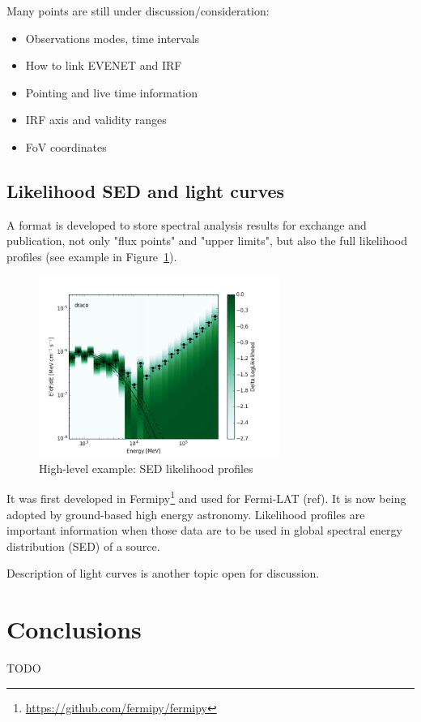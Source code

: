 Many points are still under discussion/consideration:

\begin{itemize}
\item{}Observations modes, time intervals
\item{}How to link EVENET and IRF
\item{}Pointing and live time information
\item{}IRF axis and validity ranges
\item{}FoV coordinates
\end{itemize}

\subsection{Likelihood SED and light curves}

A format is developed to store spectral analysis results for exchange and publication, not only "flux points" and "upper limits", but also the full likelihood profiles (see example in Figure~\ref{fig:sed}).

\begin{figure}[tb]
  \centerline{\includegraphics[width=0.7\textwidth]{figures/llsed_hights}}
  \caption{High-level example: SED likelihood profiles}
  \label{fig:sed}
\end{figure}

It was first developed in Fermipy\footnote{\url{https://github.com/fermipy/fermipy}} and used for Fermi-LAT (ref). It is now being adopted by ground-based high energy astronomy. Likelihood profiles are important information when those data are to be used in global spectral energy distribution (SED) of a source. 

Description of light curves is another topic open for discussion. 

\section{Conclusions}

TODO
